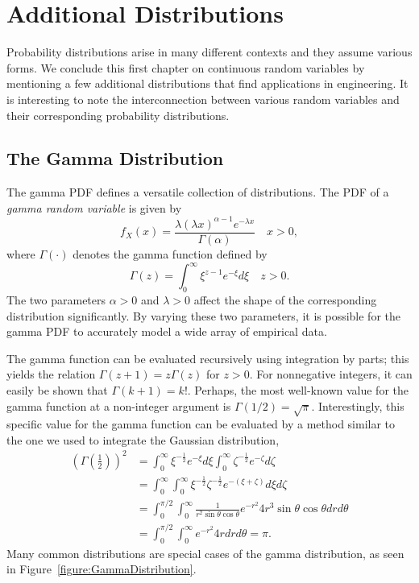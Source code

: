 \section{Additional Distributions}

Probability distributions arise in many different contexts and they assume various forms.
We conclude this first chapter on continuous random variables by mentioning a few additional distributions that find applications in engineering.
It is interesting to note the interconnection between various random variables and their corresponding probability distributions.


\subsection{The Gamma Distribution}

The gamma PDF defines a versatile collection of distributions.
The PDF of a \emph{gamma random variable} is given by 
\begin{equation*}
f_X (x) = \frac{\lambda (\lambda x)^{\alpha - 1} e^{-\lambda x}}{\Gamma (\alpha)} \quad  x > 0,
\end{equation*}
where $\Gamma(\cdot)$ denotes the gamma function defined by
\begin{equation*}
\Gamma (z) = \int_0^{\infty} \xi^{z-1} e^{-\xi} d\xi \quad z > 0 .
\end{equation*}
The two parameters $\alpha > 0$ and $\lambda > 0$ affect the shape of the corresponding distribution significantly.
By varying these two parameters, it is possible for the gamma PDF to accurately model a wide array of empirical data.

The gamma function can be evaluated recursively using integration by parts; this yields the relation $\Gamma (z+1) = z \Gamma (z)$ for $z > 0$.
For nonnegative integers, it can easily be shown that $\Gamma (k + 1) = k!$.
Perhaps, the most well-known value for the gamma function at a non-integer argument is $\Gamma ( 1/2 ) = \sqrt{\pi}$.
Interestingly, this specific value for the gamma function can be evaluated by a method similar to the one we used to integrate the Gaussian distribution,
\begin{equation*}
\begin{split}
\left( \Gamma \left( \frac{1}{2} \right) \right)^2
&= \int_0^{\infty} \xi^{-\frac{1}{2}} e^{-\xi} d\xi
\int_0^{\infty} \zeta^{-\frac{1}{2}} e^{-\zeta} d\zeta \\
&= \int_0^{\infty} \int_0^{\infty}
\xi^{-\frac{1}{2}} \zeta^{-\frac{1}{2}} e^{-(\xi + \zeta)}
d\xi d\zeta \\
&= \int_0^{\pi / 2} \int_0^{\infty}
\frac{1}{r^2 \sin \theta \cos \theta} e^{-r^2}
4 r^3 \sin \theta \cos \theta dr d\theta \\
&= \int_0^{\pi / 2} \int_0^{\infty}
 e^{-r^2} 4 r dr d\theta
= \pi .
\end{split}
\end{equation*}
Many common distributions are special cases of the gamma distribution, as seen in Figure~\ref{figure:GammaDistribution}.

